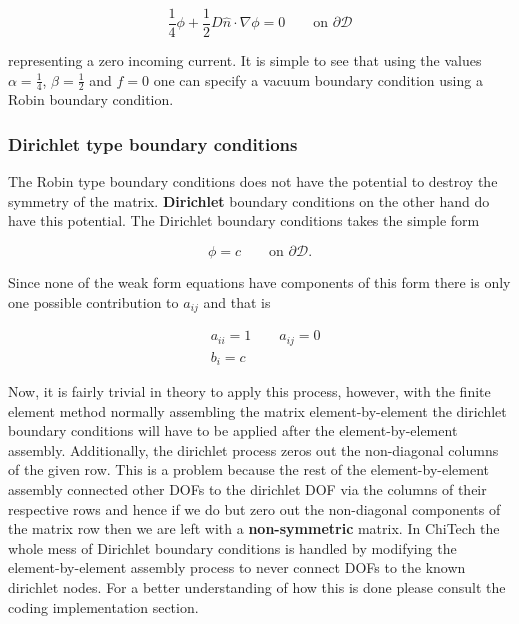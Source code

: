 \documentclass[11pt,letterpaper,titlepage]{article}
\newcommand{\bOmega}{\mathcal{D}}
\numberwithin{equation}{section}
\begin{document}
\begin{equation*}
\frac{1}{4}\phi + \frac{1}{2}D\hat{n}\cdot\nabla\phi = 0 \quad \quad \text{on } \partial \bOmega
\end{equation*}

representing a zero incoming current. It is simple to see that using the values $\alpha = \frac{1}{4}$, $\beta=\frac{1}{2}$ and $f=0$ one can specify a vacuum boundary condition using a Robin boundary condition.

\subsubsection{Dirichlet type boundary conditions}
The Robin type boundary conditions does not have the potential to destroy the symmetry of the matrix. \textbf{Dirichlet} boundary conditions on the other hand do have this potential. The Dirichlet boundary conditions takes the simple form

\begin{equation*}
\phi = c \quad \quad \text{on } \partial \bOmega.
\end{equation*}

Since none of the weak form equations have components of this form there is only one possible contribution to $a_{ij}$ and that is

\begin{equation*}
\begin{aligned}
&a_{ii} \mathbf{=} 1 \quad \quad a_{ij}=0\\
&b_i = c
\end{aligned}
\end{equation*}

Now, it is fairly trivial in theory to apply this process, however, with the finite element method normally assembling the matrix element-by-element the dirichlet boundary conditions will have to be applied after the element-by-element assembly. Additionally, the dirichlet process zeros out the non-diagonal columns of the given row. This is a problem because the rest of the element-by-element assembly connected other DOFs to the dirichlet DOF via the columns of their respective rows and hence if we do but zero out the non-diagonal components of the matrix row then we are left with a \textbf{non-symmetric} matrix.
\newline
\newline
In ChiTech the whole mess of Dirichlet boundary conditions is handled by modifying the element-by-element assembly process to never connect DOFs to the known dirichlet nodes. For a better understanding of how this is done please consult the coding implementation section.
\end{document}
